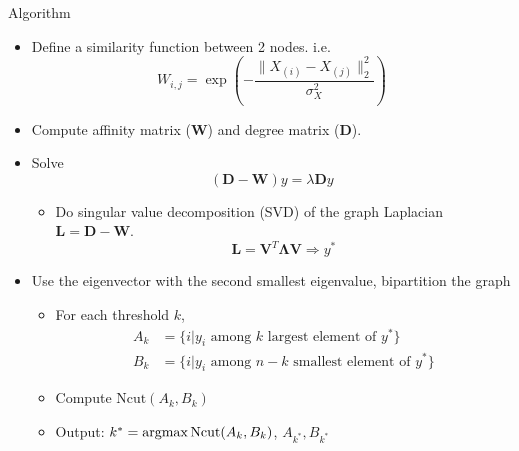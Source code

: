 \documentclass[10pt,mathserif]{beamer}
\begin{document}
\begin{frame}{Algorithm}
\begin{itemize}
    \item Define a similarity function between 2 nodes. i.e.
    \begin{equation*}
        W_{i,j} = \exp(-\frac{\|X_{(i)} - X_{(j)}\|_2^2}{\sigma_X^2})
    \end{equation*}
    \item Compute affinity matrix ($\bm{W}$) and degree matrix ($\bm{D}$).
    \item Solve
    \begin{equation*}
        (\bm{D}-\bm{W})y = \lambda \bm{D}y
    \end{equation*}
    \begin{itemize}
        \item Do singular value decomposition (SVD) of the graph Laplacian $\bm{L} = \bm{D} - \bm{W}$.
        \begin{equation*}
            \bm{L} = \bm{V}^T \bm{\Lambda} \bm{V} 	\Rightarrow y^*
        \end{equation*}
    \end{itemize}
    \item Use the eigenvector with the second smallest eigenvalue, bipartition the graph
    \begin{itemize}
        \item For each threshold $k$,
        \begin{equation*}
            \begin{split}
                A_k & =\{i | y_i \text{ among } k \text{ largest element of } y^*\}\\
                B_k & =\{i | y_i \text{ among } n-k \text{ smallest element of } y^*\}
            \end{split}
        \end{equation*}
        \item Compute $\text{Ncut}(A_k,B_k)$
        \item Output: $k^* = \mathop{\rm argmax}\text{Ncut}(A_k,B_k)$, $A_{k^*},B_{k^*}$
    \end{itemize}  
\end{itemize}  
\end{frame}
\end{document}
